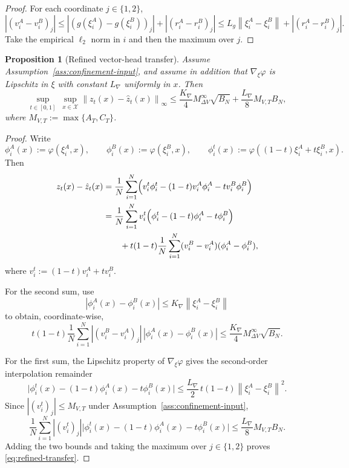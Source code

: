 \documentclass[11pt]{article}
\newtheorem{proposition}[theorem]{Proposition}
\theoremstyle{definition}
\newcommand{\norm}[1]{\left\lVert #1 \right\rVert}
\newcommand{\mc}[1]{\mathcal{#1}}
\begin{document}
\begin{proof}
For each coordinate $j\in\{1,2\}$,
\[
  |(v_i^A-v_i^B)_j|
  \le
  |(g(\xi_i^A)-g(\xi_i^B))_j|
  +
  |(r_i^A-r_i^B)_j|
  \le
  L_g\norm{\xi_i^A-\xi_i^B} + |(r_i^A-r_i^B)_j|.
\]
Take the empirical $\ell_2$ norm in $i$ and then the maximum over $j$.
\end{proof}

\begin{proposition}[Refined vector-head transfer]
\label{prop:refined-transfer}
Assume Assumption~\ref{ass:confinement-input}, and assume in addition that
$\nabla_\xi\varphi$ is Lipschitz in $\xi$ with constant $L_{\nabla}$ uniformly
in $x$. Then
\begin{equation}
  \sup_{t\in[0,1]}\ \sup_{x\in\mc{X}}
  \norm{z_t(x)-\hat z_t(x)}_\infty
  \le
  \frac{K_{\nabla}}{4} M_{\Delta V}^\infty \sqrt{B_N}
  +
  \frac{L_{\nabla}}{8} M_{V,T} B_N,
  \label{eq:refined-transfer}
\end{equation}
where $M_{V,T}:=\max\{A_T,C_T\}$.
\end{proposition}

\begin{proof}
Write
\[
  \phi_i^A(x):=\varphi(\xi_i^A,x),
  \qquad
  \phi_i^B(x):=\varphi(\xi_i^B,x),
  \qquad
  \phi_i^t(x):=\varphi((1-t)\xi_i^A+t\xi_i^B,x).
\]
Then
\begin{align*}
  z_t(x)-\hat z_t(x)
  &=
  \frac1N\sum_{i=1}^N
  \Bigl(
    v_i^t\phi_i^t-(1-t)v_i^A\phi_i^A-tv_i^B\phi_i^B
  \Bigr)
  \\
  &=
  \frac1N\sum_{i=1}^N
  v_i^t
  \Bigl(
    \phi_i^t-(1-t)\phi_i^A-t\phi_i^B
  \Bigr)
  \\
  &\qquad
  +
  t(1-t)\frac1N\sum_{i=1}^N
  (v_i^B-v_i^A)(\phi_i^A-\phi_i^B),
\end{align*}
where $v_i^t:=(1-t)v_i^A+tv_i^B$.

For the second sum, use
\[
  |\phi_i^A(x)-\phi_i^B(x)|
  \le
  K_{\nabla}\norm{\xi_i^A-\xi_i^B}
\]
to obtain, coordinate-wise,
\[
  t(1-t)\frac1N\sum_{i=1}^N
  |(v_i^B-v_i^A)_j|\,|\phi_i^A(x)-\phi_i^B(x)|
  \le
  \frac{K_{\nabla}}{4} M_{\Delta V}^\infty \sqrt{B_N}.
\]

For the first sum, the Lipschitz property of $\nabla_\xi\varphi$ gives the
second-order interpolation remainder
\[
  \bigl|
    \phi_i^t(x)-(1-t)\phi_i^A(x)-t\phi_i^B(x)
  \bigr|
  \le
  \frac{L_{\nabla}}{2}\,t(1-t)\norm{\xi_i^A-\xi_i^B}^2.
\]
Since $| (v_i^t)_j |\le M_{V,T}$ under
Assumption~\ref{ass:confinement-input},
\[
  \frac1N\sum_{i=1}^N
  |(v_i^t)_j|
  \bigl|
    \phi_i^t(x)-(1-t)\phi_i^A(x)-t\phi_i^B(x)
  \bigr|
  \le
  \frac{L_{\nabla}}{8} M_{V,T} B_N.
\]
Adding the two bounds and taking the maximum over $j\in\{1,2\}$ proves
\eqref{eq:refined-transfer}.
\end{proof}
\end{document}
